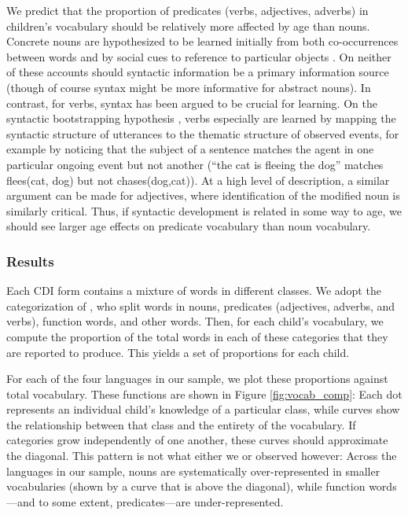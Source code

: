 \documentclass[10pt,letterpaper]{article}
\begin{document}
We predict that the proportion of predicates (verbs, adjectives, adverbs) in children's vocabulary should be relatively more affected by age than nouns. Concrete nouns are hypothesized to be learned initially from both co-occurrences between words \cite{yu2007b} and by social cues to reference to particular objects \cite{bloom2002}. On neither of these accounts should syntactic information be a primary information source (though of course syntax might be more informative for abstract nouns). In contrast, for verbs, syntax has been argued to be crucial for learning. On the syntactic bootstrapping hypothesis \cite{gleitman1990,fisher2010}, verbs especially are learned by mapping the syntactic structure of utterances to the thematic structure of observed events, for example by noticing that the subject of a sentence matches the agent in one particular ongoing event but not another (``the cat is fleeing the dog'' matches {\sc flees(cat, dog)} but not {\sc chases(dog,cat)}). At a high level of description, a similar argument can be made for adjectives, where identification of the modified noun is similarly critical. Thus, if syntactic development is related in some way to age, we should see larger age effects on predicate vocabulary than noun vocabulary. 

\subsubsection{Results}

Each CDI form contains a mixture of words in different classes. We adopt the categorization of , who split words in nouns, predicates (adjectives, adverbs, and verbs), function words, and other words. Then, for each child's vocabulary, we compute the proportion of the total words in each of these categories that they are reported to produce. This yields a set of proportions for each child.

For each of the four languages in our sample, we plot these proportions against total vocabulary. These functions are shown in Figure \ref{fig:vocab_comp}: Each dot represents an individual child's knowledge of a particular class, while curves show the relationship between that class and the entirety of the vocabulary. If categories grow independently of one another, these curves should approximate the diagonal. This pattern is not what either we or \citeauthor{bates1994} observed however: Across the languages in our sample, nouns are systematically over-represented in smaller vocabularies (shown by a curve that is above the diagonal), while function words---and to some extent, predicates---are under-represented. 
\end{document}
